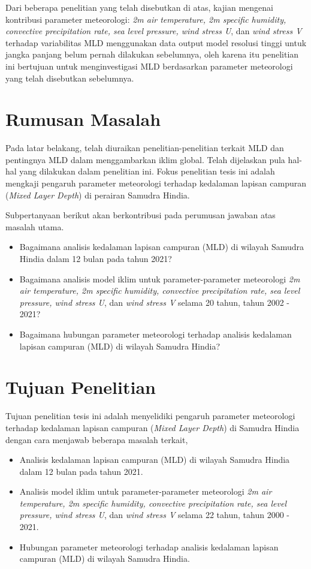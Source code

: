 \begin{spacing}{1.5}
	Dari beberapa penelitian yang telah disebutkan di atas, kajian mengenai kontribusi parameter meteorologi: \textit{2m air temperature, 2m specific humidity, convective precipitation rate, sea level pressure, wind stress U}, dan \textit{wind stress V} terhadap variabilitas MLD menggunakan data output model resolusi tinggi untuk jangka panjang belum pernah dilakukan sebelumnya, oleh karena itu penelitian ini bertujuan untuk menginvestigasi MLD berdasarkan parameter meteorologi yang telah disebutkan sebelumnya. 
	
	\section[Rumusan Masalah]{Rumusan Masalah}
	Pada latar belakang, telah diuraikan penelitian-penelitian terkait MLD dan pentingnya MLD dalam menggambarkan iklim global. Telah dijelaskan pula hal-hal yang dilakukan dalam penelitian ini. Fokus penelitian tesis ini adalah mengkaji pengaruh parameter meteorologi terhadap kedalaman lapisan campuran (\textit{Mixed Layer Depth}) di perairan Samudra Hindia.
	
	Subpertanyaan berikut akan berkontribusi pada perumusan jawaban atas masalah utama.
	\begin{itemize}
		\item Bagaimana analisis kedalaman lapisan campuran (MLD) di wilayah Samudra Hindia dalam 12 bulan pada tahun 2021? 
		\item Bagaimana analisis model iklim untuk parameter-parameter meteorologi \textit{2m air temperature, 2m specific humidity, convective precipitation rate, sea level pressure, wind stress U}, dan \textit{wind stress V} selama 20 tahun, tahun 2002 - 2021?
		\item Bagaimana hubungan parameter meteorologi terhadap analisis kedalaman lapisan campuran (MLD) di wilayah Samudra Hindia?
	\end{itemize}	
	\section[Tujuan Penelitian]{Tujuan Penelitian}
	
	Tujuan penelitian tesis ini adalah menyelidiki pengaruh parameter meteorologi terhadap kedalaman lapisan campuran (\textit{Mixed Layer Depth}) di Samudra Hindia dengan cara menjawab beberapa masalah terkait,
	
	\begin{itemize}
		\item Analisis kedalaman lapisan campuran (MLD) di wilayah Samudra Hindia dalam 12 bulan pada tahun 2021.
		\item Analisis model iklim untuk parameter-parameter meteorologi \textit{2m air temperature, 2m specific humidity, convective precipitation rate, sea level pressure, wind stress U}, dan \textit{wind stress V} selama 22 tahun, tahun 2000 - 2021.
		\item Hubungan parameter meteorologi terhadap analisis kedalaman lapisan campuran (MLD) di wilayah Samudra Hindia.
	\end{itemize}
	

\end{spacing}
